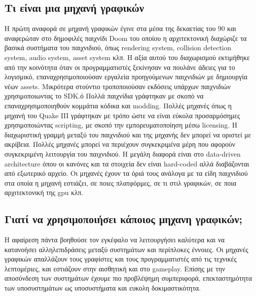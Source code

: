 	\subsection {Τι είναι μια μηχανή γραφικών}
	Η πρώτη αναφορά σε μηχανή γραφικών έγινε στα μέσα της δεκαετίας του 90 και αναφερώταν στο δημοφιλές παιχνίδι Doom του οποίου η αρχιτεκτονική διαχώριζε τα βασικά συστήματα του παιχνιδιού, όπως rendering system, collision detection system, audio system, asset system κλπ. Η αξία αυτού του διαχωρισμού εκτιμήθηκε από την κοινότητα όταν οι προγραμματιστές ξεκίνησαν να πουλάνε άδειες για το λογισμικό, επαναχρησιμοποιούσαν εργαλεία προηγούμενων παιχνιδιών με δημιουργία νέων assets. Μικρότερα στούντιο τροποποιούσαν εκδόσεις υπάρχων παιχνιδιών χρησιμοποιωντας το SDK.ό
	Πολλά παιχνίδια γράφτηκαν με σκοπό να επαναχρησιμοποιηθούν κομμάτια κόδικα και modding. Πολλές μηχανές όπως η μηχανή του Quake III γράφτηκαν με τρόπο ώστε να είναι εύκολα προσαρμόσημες χρησιμοποιώντας scripting, με σκοπό την εμπορευματοποίηση μέσω licensing.
	Η διαχωριστική γραμμή μεταξύ του παιχνιδιού και της μηχανής δεν μπορεί να οριστεί με ακρίβεια. Πολλές μηχανές μπορεί να περιέχουν συγκεκριμένα μέρη που αφορούν συγκεκριμένη λειτουργία του παιχνιδιού. Η μεγάλη διαφορά είναι στο data-driven architecture όπου οι κανόνες και τα στοιχεία δεν είναι hard-coded αλλά διαβάζονται από εξωτερικό αρχείο.
	Οι μηχανές έχουν τα όριά τους ανάλογα με τα είδη παιχνιδιού στα οποία η μηχανή εστιάζει, σε ποιες πλατφόρμες, σε τι στιλ γραφικών, σε ποια αρχιτεκτονική της gpu κλπ. 
	
	\subsection{Γιατί να χρησιμοποιήσει κάποιος μηχανη γραφικών;}	
	Η αφαίρεση πάντα βοηθούσε τον εγκέφαλο να λειτουργήσει καλύτερα και να κατανοήσει αλληλεπιδράσεις μεταξύ συστημάτων και περίπλοκες έννοιες. Οι μηχανές γραφικών απαλλάζουν τους γραφίστες και τους προγραμματιστές από τις τεχνικές λεπτομέριες, και εστιάζουν στην αισθητική και στο gameplay. Επίσης με την αποσύνδεση των συστημάτων έχουμε πιο προβλέψημη συμπεριφορά, επεκταστημότητα των υποσυστημάτων ως υποσυστήματα και ευκολη δοκιμαστικότητα.
	
